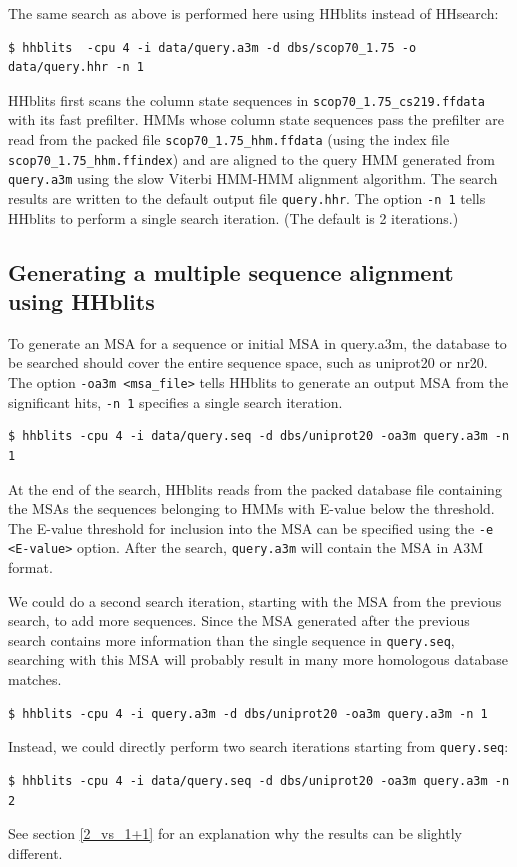 \documentclass[11pt,a4paper]{article}
\begin{document}
The same search as above is performed here using HHblits instead of HHsearch:
\begin{verbatim}
$ hhblits  -cpu 4 -i data/query.a3m -d dbs/scop70_1.75 -o data/query.hhr -n 1
\end{verbatim}

HHblits first scans the column state sequences in \verb`scop70_1.75_cs219.ffdata` with its fast prefilter. HMMs whose column state sequences pass the prefilter are read from the packed file \verb`scop70_1.75_hhm.ffdata` (using the index file \verb`scop70_1.75_hhm.ffindex`) and are aligned to the query HMM generated from \verb`query.a3m` using the slow Viterbi HMM-HMM alignment algorithm. The search results are written to the default output file \verb`query.hhr`. The option \verb`-n 1` tells HHblits to perform a single search iteration. (The default is 2 iterations.)


\subsection{Generating a multiple sequence alignment using HHblits}\label{msa_hhblits}

To generate an MSA for a sequence or initial MSA in query.a3m, the database to be searched should cover the entire sequence space, such as uniprot20 or nr20. The option \verb`-oa3m <msa_file>` tells HHblits to generate an output MSA from the significant hits, \verb`-n 1` specifies a single search iteration.
\begin{verbatim}
$ hhblits -cpu 4 -i data/query.seq -d dbs/uniprot20 -oa3m query.a3m -n 1
\end{verbatim}

At the end of the search, HHblits reads from the packed database file containing the MSAs the sequences belonging to HMMs with E-value below the threshold. The E-value threshold for inclusion into the MSA can be specified using the \verb`-e <E-value>` option. After the search, \verb`query.a3m` will contain the MSA in A3M format.

We could do a second search iteration, starting with the MSA from the previous search, to add more sequences. Since the MSA generated after the previous search contains more information than the single sequence in \verb`query.seq`, searching with this MSA will probably result in many more homologous database matches.
\begin{verbatim}
$ hhblits -cpu 4 -i query.a3m -d dbs/uniprot20 -oa3m query.a3m -n 1
\end{verbatim}
Instead, we could directly perform two search iterations starting from \verb`query.seq`:
\begin{verbatim}
$ hhblits -cpu 4 -i data/query.seq -d dbs/uniprot20 -oa3m query.a3m -n 2 
\end{verbatim}
See section \ref{2_vs_1+1} for an explanation why the results can be slightly different.
\end{document}
